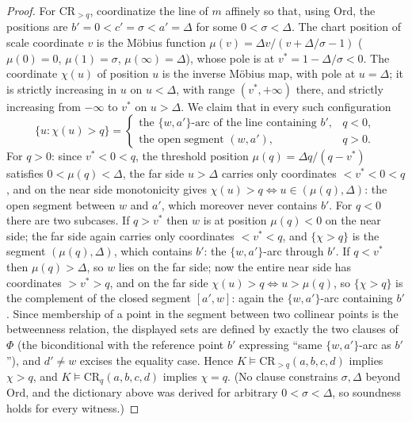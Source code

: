 \documentclass[10pt,a4paper]{amsart}
\begin{document}
\begin{proof}
For $\mathrm{CR}_{>q}$, coordinatize the line of $m$ affinely so that, using
$\mathrm{Ord}$, the positions are $b'=0<c'=\sigma<a'=\Delta$ for some
$0<\sigma<\Delta$. The chart position of scale coordinate $v$ is the
M\"obius function $\mu(v)=\Delta v/(v+\Delta/\sigma-1)$
\textup($\mu(0)=0$, $\mu(1)=\sigma$, $\mu(\infty)=\Delta$\textup), whose pole
is at $v^{*}=1-\Delta/\sigma<0$. The coordinate $\chi(u)$ of position $u$ is
the inverse M\"obius map, with pole at $u=\Delta$; it is strictly increasing
in $u$ on $u<\Delta$, with range $(v^*,+\infty)$ there, and strictly
increasing from $-\infty$ to $v^{*}$ on $u>\Delta$. We claim that in every
such configuration
\[
\{u:\chi(u)>q\}=
\begin{cases}
\text{the }\{w,a'\}\text{-arc of the line containing }b', & q<0,\\
\text{the open segment }(w,a'), & q>0 .
\end{cases}
\]
For $q>0$: since $v^{*}<0<q$, the threshold position
$\mu(q)=\Delta q/(q-v^{*})$ satisfies $0<\mu(q)<\Delta$, the far side
$u>\Delta$ carries only coordinates $<v^{*}<0<q$, and on the near side
monotonicity gives $\chi(u)>q\iff u\in(\mu(q),\Delta)$: the open segment
between $w$ and $a'$, which moreover never contains $b'$. For $q<0$ there are
two subcases. If $q>v^{*}$ then $w$ is at position $\mu(q)<0$ on the near
side; the far side again carries only coordinates $<v^{*}<q$, and
$\{\chi>q\}$ is the segment $(\mu(q),\Delta)$, which contains $b'$: the
$\{w,a'\}$-arc through $b'$. If $q<v^{*}$ then $\mu(q)>\Delta$, so $w$ lies
on the far side; now the entire near side has coordinates $>v^{*}>q$, and on
the far side $\chi(u)>q\iff u>\mu(q)$, so $\{\chi>q\}$ is the complement of
the closed segment $[a',w]$: again the $\{w,a'\}$-arc containing $b'$. Since
membership of a point in the segment between two collinear points is the
betweenness relation, the displayed sets are defined by exactly the two
clauses of $\Phi$ \textup(the biconditional with the reference point $b'$
expressing ``same $\{w,a'\}$-arc as $b'$''\textup), and $d'\ne w$ excises the
equality case. Hence $K\models\mathrm{CR}_{>q}(a,b,c,d)$ implies $\chi>q$,
and $K\models\mathrm{CR}_q(a,b,c,d)$ implies $\chi=q$. \textup(No clause
constrains $\sigma,\Delta$ beyond $\mathrm{Ord}$, and the dictionary above
was derived for arbitrary $0<\sigma<\Delta$, so soundness holds for every
witness.\textup)


\end{proof}
\end{document}
